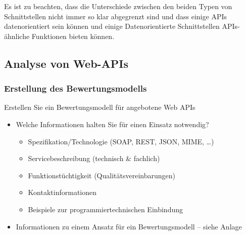 \documentclass[notitlepage, hidelinks]{article}
\begin{document}
Es ist zu beachten, dass die Unterschiede zwischen den beiden Typen von Schnittstellen nicht immer so klar abgegrenzt sind und dass einige APIs datenorientiert sein können und einige Datenorientierte Schnittstellen APIs-ähnliche Funktionen bieten können.


\subsection{Analyse von Web-APIs}

\subsubsection{Erstellung des Bewertungsmodells}
Erstellen Sie ein Bewertungsmodell für angebotene Web APIs
\begin{itemize}
\item Welche Informationen halten Sie für einen Einsatz notwendig?
\begin{itemize}
\item Spezifikation/Technologie (SOAP, REST, JSON, MIME, …)
\item Servicebeschreibung (technisch \& fachlich)
\item Funktionstüchtigkeit (Qualitätsvereinbarungen)
\item Kontaktinformationen
\item Beispiele zur programmiertechnischen Einbindung
\end{itemize}
\item Informationen zu einem Ansatz für ein Bewertungsmodell – siehe Anlage
\end{itemize}
\end{document}
